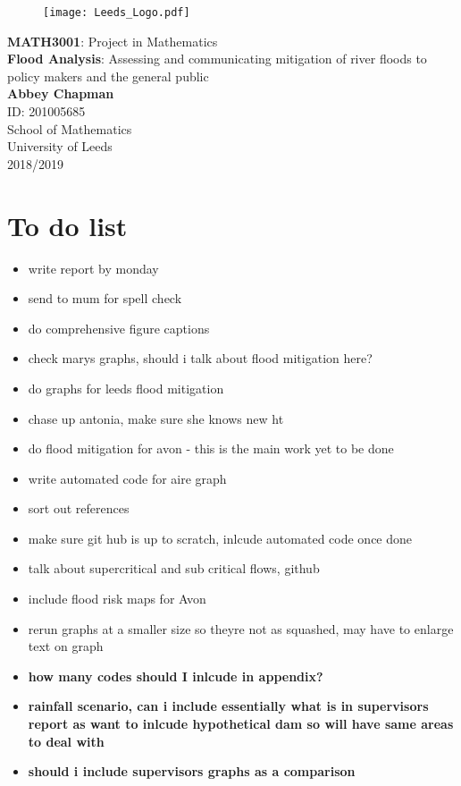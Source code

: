\documentclass[11pt,a4paper]{article}
\begin{document}
\begin{titlepage}
\begin{center}

\begin{figure}[H]
\centering
\texttt{[image: Leeds\_Logo.pdf]}
\end{figure}

\vspace{4cm}
{\LARGE \textbf{MATH3001}: Project in Mathematics}\\

\vspace{1cm}
{\Huge \textbf{Flood Analysis}: Assessing and communicating mitigation of river floods to policy makers and the general public}\\
\vspace{5cm}
\textbf{Abbey Chapman}\\
ID: 201005685\\
\vfill
School of Mathematics\\
University of Leeds\\
2018/2019
\end{center}
\end{titlepage}

\tableofcontents 
\noindent \hrulefill

\newpage
\section{To do list}
\begin{itemize}
\item write report by monday
\item send to mum for spell check
\item do comprehensive figure captions
\item check marys graphs, should i talk about flood mitigation here?
\item do graphs for leeds flood mitigation
\item chase up antonia, make sure she knows new ht
\item do flood mitigation for avon - this is the main work yet to be done
\item write automated code for aire graph
\item sort out references
\item make sure git hub is up to scratch, inlcude automated code once done
\item talk about supercritical and sub critical flows, github
\item include flood risk maps for Avon
\item rerun graphs at a smaller size so theyre not as squashed, may have to enlarge text on graph
\item \textbf{how many codes should I inlcude in appendix?}
\item \textbf{rainfall scenario, can i include essentially what is in supervisors report as want to inlcude hypothetical dam so will have same areas to deal with}
\item \textbf{should i include supervisors graphs as a comparison}
\end{itemize}
\end{document}
